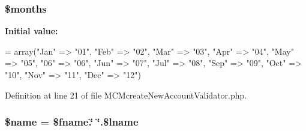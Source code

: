 \hypertarget{_m_c_mcreate_new_account_validator_8php_a88a8980708982166840708b055e335b8}{
\subsubsection[{\$months}]{\setlength{\rightskip}{0pt plus 5cm}\$months}}\label{_m_c_mcreate_new_account_validator_8php_a88a8980708982166840708b055e335b8}
{\bfseries Initial value\-:}
\begin{DoxyCode}
= array(\textcolor{stringliteral}{"Jan"} => \textcolor{stringliteral}{"01"},
                    \textcolor{stringliteral}{"Feb"} => \textcolor{stringliteral}{"02"},
                    \textcolor{stringliteral}{"Mar"} => \textcolor{stringliteral}{"03"},
                    \textcolor{stringliteral}{"Apr"} => \textcolor{stringliteral}{"04"},
                    \textcolor{stringliteral}{"May"} => \textcolor{stringliteral}{"05"},
                    \textcolor{stringliteral}{"06"} => \textcolor{stringliteral}{"06"},
                    \textcolor{stringliteral}{"Jun"} => \textcolor{stringliteral}{"07"},
                    \textcolor{stringliteral}{"Jul"} => \textcolor{stringliteral}{"08"},
                    \textcolor{stringliteral}{"Sep"} => \textcolor{stringliteral}{"09"},
                    \textcolor{stringliteral}{"Oct"} => \textcolor{stringliteral}{"10"},
                    \textcolor{stringliteral}{"Nov"} => \textcolor{stringliteral}{"11"},
                    \textcolor{stringliteral}{"Dec"} => \textcolor{stringliteral}{"12"})
\end{DoxyCode}


Definition at line 21 of file M\-C\-Mcreate\-New\-Account\-Validator.\-php.

\hypertarget{_m_c_mcreate_new_account_validator_8php_ab2fc40d43824ea3e1ce5d86dee0d763b}{
\subsubsection[{\$name}]{\setlength{\rightskip}{0pt plus 5cm}\$name = \$fname.\char`\"{} \char`\"{}.\$lname}}\label{_m_c_mcreate_new_account_validator_8php_ab2fc40d43824ea3e1ce5d86dee0d763b}


